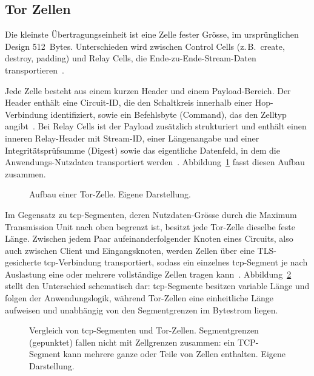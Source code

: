\subsection{Tor Zellen}

Die kleinste Übertragungseinheit ist eine Zelle fester Grösse, im ursprünglichen Design 512~Bytes.
Unterschieden wird zwischen Control Cells (z.\,B.\ create, destroy, padding) und Relay Cells, die Ende-zu-Ende-Stream-Daten transportieren~\cite{dingledine2004tor}.

Jede Zelle besteht aus einem kurzen Header und einem Payload-Bereich.
Der Header enthält eine Circuit-ID, die den Schaltkreis innerhalb einer Hop-Verbindung identifiziert, sowie ein Befehlsbyte (Command), das den Zelltyp angibt~\cite{dingledine2004tor}.
Bei Relay Cells ist der Payload zusätzlich strukturiert und enthält einen inneren Relay-Header mit Stream-ID, einer Längenangabe und einer Integritätsprüfsumme (Digest) sowie das eigentliche Datenfeld, in dem die Anwendungs-Nutzdaten transportiert werden~\cite{dingledine2004tor}.
Abbildung~\ref{fig:tor_cell_layout} fasst diesen Aufbau zusammen.

\begin{figure}[H]
\centering
\resizebox{\textwidth}{!}{%
%
}
\caption{Aufbau einer Tor-Zelle. Eigene Darstellung.}
\label{fig:tor_cell_layout}
\end{figure}

Im Gegensatz zu \gls{tcp}-Segmenten, deren Nutzdaten-Grösse durch die Maximum Transmission Unit nach oben begrenzt ist, besitzt jede Tor-Zelle dieselbe feste Länge.
Zwischen jedem Paar aufeinanderfolgender Knoten eines Circuits, also auch zwischen Client und Eingangsknoten, werden Zellen über eine TLS-gesicherte \gls{tcp}-Verbindung transportiert, sodass ein einzelnes \gls{tcp}-Segment je nach Auslastung eine oder mehrere vollständige Zellen tragen kann~\cite{dingledine2004tor}.
Abbildung~\ref{fig:tcp_vs_cells} stellt den Unterschied schematisch dar: \gls{tcp}-Segmente besitzen variable Länge und folgen der Anwendungslogik, während Tor-Zellen eine einheitliche Länge aufweisen und unabhängig von den Segmentgrenzen im Bytestrom liegen.

\begin{figure}[H]
\centering
\resizebox{\textwidth}{!}{%
%
}
\caption{Vergleich von \gls{tcp}-Segmenten und Tor-Zellen. Segmentgrenzen (gepunktet) fallen nicht mit Zellgrenzen zusammen: ein TCP-Segment kann mehrere ganze oder Teile von Zellen enthalten. Eigene Darstellung.}
\label{fig:tcp_vs_cells}
\end{figure}


